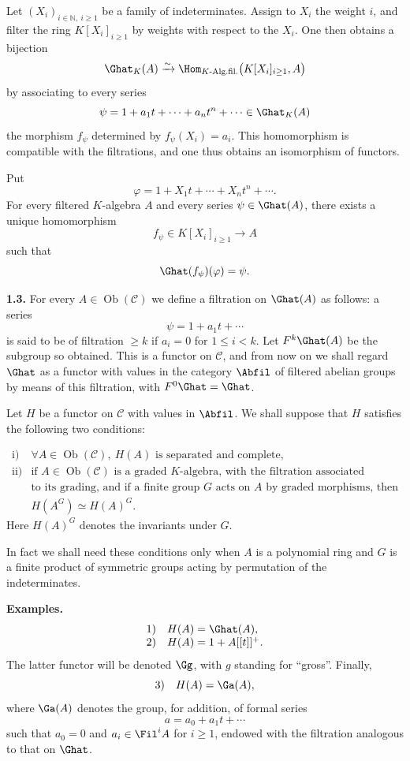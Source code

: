 Let \((X_i)_{i\in\mathbb N,\ i\geq 1}\) be a family of indeterminates. Assign to \(X_i\) the weight \(i\), and filter the ring \(K[X_i]_{i\geq 1}\) by weights with respect to the \(X_i\). One then obtains a bijection
\[
  \Ghat_K(A)\xrightarrow{\sim}
  \Hom_{K\text{-Alg.fil.}}\bigl(K[X_i]_{i\geq 1},A\bigr)
\]
by associating to every series
\[
  \psi=1+a_1t+\cdots+a_nt^n+\cdots\in\Ghat_K(A)
\]
the morphism \(f_\psi\) determined by \(f_\psi(X_i)=a_i\). This homomorphism is compatible with the filtrations, and one thus obtains an isomorphism of functors.

Put
\[
  \varphi=1+X_1t+\cdots+X_nt^n+\cdots .
\]
For every filtered \(K\)-algebra \(A\) and every series \(\psi\in\Ghat(A)\), there exists a unique homomorphism
\[
  f_\psi\in K[X_i]_{i\geq 1}\longrightarrow A
\]
such that
\[
  \Ghat(f_\psi)(\varphi)=\psi .
\]

\textbf{1.3.} For every \(A\in\operatorname{Ob}(\mathcal C)\) we define a filtration on \(\Ghat(A)\) as follows: a series
\[
  \psi=1+a_1t+\cdots
\]
is said to be of filtration \(\geq k\) if \(a_i=0\) for \(1\leq i<k\). Let \(F^k\Ghat(A)\) be the subgroup so obtained. This is a functor on \(\mathcal C\), and from now on we shall regard \(\Ghat\) as a functor with values in the category \(\Abfil\) of filtered abelian groups by means of this filtration, with \(F^0\Ghat=\Ghat\).

Let \(H\) be a functor on \(\mathcal C\) with values in \(\Abfil\). We shall suppose that \(H\) satisfies the following two conditions:

\[
\begin{array}{ll}
\text{i)} & \forall A\in\operatorname{Ob}(\mathcal C),\ H(A)\text{ is separated and complete},\\[0.3em]
\text{ii)} & \text{if }A\in\operatorname{Ob}(\mathcal C)\text{ is a graded }K\text{-algebra, with the filtration associated}\\
&\text{to its grading, and if a finite group }G\text{ acts on }A\text{ by graded morphisms, then}\\
& H(A^G)\simeq H(A)^G .
\end{array}
\]
Here \(H(A)^G\) denotes the invariants under \(G\).

In fact we shall need these conditions only when \(A\) is a polynomial ring and \(G\) is a finite product of symmetric groups acting by permutation of the indeterminates.

\textbf{Examples.}
\[
\begin{array}{ll}
1)& H(A)=\Ghat(A),\\
2)& H(A)=1+A[[t]]^+.
\end{array}
\]
The latter functor will be denoted \(\Gg\), with \(g\) standing for ``gross''. Finally,
\[
3)\quad H(A)=\Ga(A),
\]
where \(\Ga(A)\) denotes the group, for addition, of formal series
\[
  a=a_0+a_1t+\cdots
\]
such that \(a_0=0\) and \(a_i\in\Fil^i A\) for \(i\geq 1\), endowed with the filtration analogous to that on \(\Ghat\).

